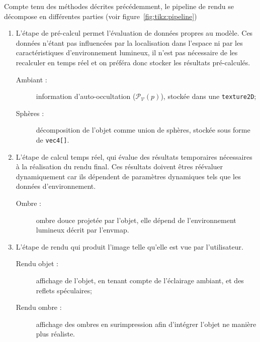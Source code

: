 \documentclass[10pt,a4paper,twoside, twocolumn]{report}
\newcommand*{\rootPath}{../}
\begin{document}
Compte tenu des méthodes décrites précédemment, le pipeline de rendu se décompose en différentes parties (voir figure~\ref{fig:tikz:pipeline})
\begin{enumerate}
	\item L’étape de pré-calcul permet l’évaluation de données propres au modèle. Ces données n’étant pas influencées par la localisation dans l’espace ni par les caractéristiques d’environnement lumineux, il n’est pas nécessaire de les recalculer en temps réel et on préféra donc stocker les résultats pré-calculés.
		\begin{description}
			\item[Ambiant :] information d’auto-occultation ($\mathcal P_{\mathcal V}(p)$), stockée dans une \texttt{texture2D};
			\item[Sphères :] décomposition de l’objet comme union de sphères, stockée sous forme de \texttt{vec4[]}.
		\end{description}

	\item L’étape de calcul temps réel, qui évalue des résultats temporaires nécessaires à la réalisation du rendu final. Ces résultats doivent êtres réévaluer dynamiquement car ils dépendent de paramètres dynamiques tels que les données d’environnement.
		\begin{description}
			\item[Ombre :] ombre douce projetée par l’objet, elle dépend de l’environnement lumineux décrit par l’envmap.
		\end{description}
	
	\item L’étape de rendu qui produit l’image telle qu’elle est vue par l’utilisateur.
		\begin{description}
			\item[Rendu objet :] affichage de l’objet, en tenant compte de l’éclairage ambiant, et des reflets spéculaires;
			\item[Rendu ombre :] affichage des ombres en surimpression afin d’intégrer l’objet ne manière plus réaliste.
		\end{description}
\end{enumerate}






\ifstandalone
	
	
\fi
\end{document}
